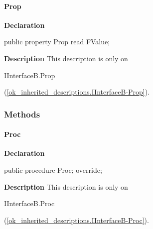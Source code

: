 \documentclass{report}
\begin{document}
\paragraph*{Prop}\hspace*{\fill}

\begin{list}{}{
\setlength{\itemindent}{0cm}
\setlength{\listparindent}{0cm}
\setlength{\leftmargin}{\evensidemargin}
\addtolength{\leftmargin}{\tmplength}
\settowidth{\labelsep}{X}
\addtolength{\leftmargin}{\labelsep}
\setlength{\labelwidth}{\tmplength}
}
\begin{flushleft}
\item[\textbf{Declaration}\hfill]
\begin{ttfamily}
public property Prop read FValue;\end{ttfamily}


\end{flushleft}
\par
\item[\textbf{Description}]
This description is only on \begin{ttfamily}IInterfaceB.Prop\end{ttfamily}(\ref{ok_inherited_descriptions.IInterfaceB-Prop}).

\end{list}
\subsubsection*{\large{\textbf{Methods}}\normalsize\hspace{1ex}\hfill}
\paragraph*{Proc}\hspace*{\fill}

\begin{list}{}{
\setlength{\itemindent}{0cm}
\setlength{\listparindent}{0cm}
\setlength{\leftmargin}{\evensidemargin}
\addtolength{\leftmargin}{\tmplength}
\settowidth{\labelsep}{X}
\addtolength{\leftmargin}{\labelsep}
\setlength{\labelwidth}{\tmplength}
}
\begin{flushleft}
\item[\textbf{Declaration}\hfill]
\begin{ttfamily}
public procedure Proc; override;\end{ttfamily}


\end{flushleft}
\par
\item[\textbf{Description}]
This description is only on \begin{ttfamily}IInterfaceB.Proc\end{ttfamily}(\ref{ok_inherited_descriptions.IInterfaceB-Proc}).

\end{list}
\end{document}
